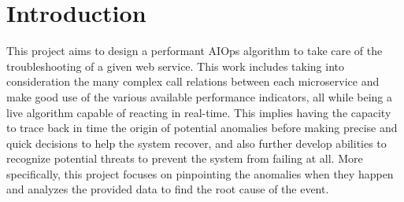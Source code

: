 \documentclass[acmsmall, screen, nonacm]{acmart}
\begin{document}
\maketitle

\section{Introduction}
This project aims to design a performant AIOps algorithm to take care of the troubleshooting of a given web service. 
This work includes taking into consideration the many complex call relations between each microservice and make good use of the various available performance indicators, all while being a live algorithm capable of reacting in real-time. 
This implies having the capacity to trace back in time the origin of potential anomalies before making precise and quick decisions to help the system recover, and also further develop abilities to recognize potential threats to prevent the system from failing at all. 
More specifically, this project focuses on pinpointing the anomalies when they happen and analyzes the provided data to find the root cause of the event. 
\end{document}
